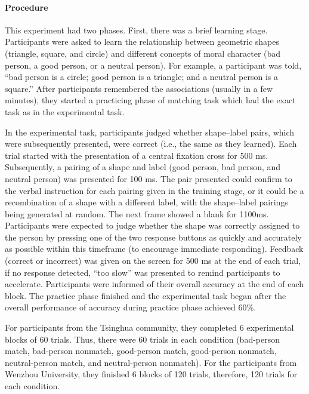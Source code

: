 \documentclass[
  english,
  man]{apa6}
\let\oldparagraph\paragraph
\renewcommand{\paragraph}[1]{\oldparagraph{#1}\mbox{}}
\begin{document}
\hypertarget{procedure}{%
\paragraph{Procedure}\label{procedure}}

This experiment had two phases. First, there was a brief learning stage. Participants were asked to learn the relationship between geometric shapes (triangle, square, and circle) and different concepts of moral character (bad person, a good person, or a neutral person). For example, a participant was told, ``bad person is a circle; good person is a triangle; and a neutral person is a square.'' After participants remembered the associations (usually in a few minutes), they started a practicing phase of matching task which had the exact task as in the experimental task.

In the experimental task, participants judged whether shape--label pairs, which were subsequently presented, were correct (i.e., the same as they learned). Each trial started with the presentation of a central fixation cross for 500 ms. Subsequently, a pairing of a shape and label (good person, bad person, and neutral person) was presented for 100 ms. The pair presented could confirm to the verbal instruction for each pairing given in the training stage, or it could be a recombination of a shape with a different label, with the shape--label pairings being generated at random. The next frame showed a blank for 1100ms. Participants were expected to judge whether the shape was correctly assigned to the person by pressing one of the two response buttons as quickly and accurately as possible within this timeframe (to encourage immediate responding). Feedback (correct or incorrect) was given on the screen for 500 ms at the end of each trial, if no response detected, ``too slow'' was presented to remind participants to accelerate. Participants were informed of their overall accuracy at the end of each block. The practice phase finished and the experimental task began after the overall performance of accuracy during practice phase achieved 60\%.

For participants from the Tsinghua community, they completed 6 experimental blocks of 60 trials. Thus, there were 60 trials in each condition (bad-person match, bad-person nonmatch, good-person match, good-person nonmatch, neutral-person match, and neutral-person nonmatch). For the participants from Wenzhou University, they finished 6 blocks of 120 trials, therefore, 120 trials for each condition.
\end{document}
